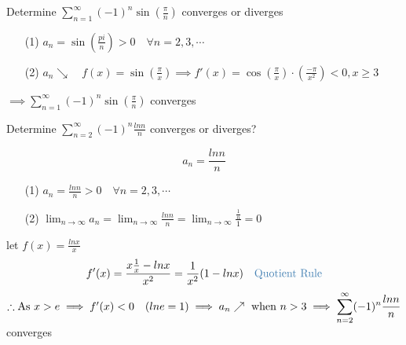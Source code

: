 \begin{eg}
Determine \(\displaystyle \sum^{\infty}_{n = 1} (-1)^n \sin (\frac{\pi}{n})\) converges or diverges

\soln
\begin{itemize}
\item[(1)] \(\displaystyle a_n = \sin (\frac{pi}{n})>0 \quad \forall n = 2, 3, \cdots\)
\item[(2)] \(\displaystyle a_n \searrow \quad f(x) = \sin (\frac{\pi}{x}) \implies f'(x) = \cos (\frac{\pi}{x}) \cdot (\frac{-\pi}{x^2}) < 0, x \geq 3\)
\end{itemize}
\(\implies \displaystyle \sum^{\infty}_{n = 1} (-1)^n \sin (\frac{\pi}{n})\) converges
\end{eg}
\begin{eg}
Determine \(\displaystyle \sum^{\infty}_{n = 2} (-1)^n \frac{ln n}{n}\) converges or diverges?

\soln
\[\displaystyle a_n = \frac{ln n}{n}\]
\begin{itemize}
\item[(1)] \(a_n = \frac{ln n}{n} > 0 \quad \forall n = 2, 3, \cdots\)
\item[(2)] \(\displaystyle \lim_{n \to \infty} a_n = \lim_{n \to \infty} \frac{ln n}{n} = \lim_{n \to \infty} \frac{\frac{1}{n}}{1} = 0\)
\end{itemize}
let \(\displaystyle f(x) = \frac{lnx}{x}\)
\[\displaystyle f'(x) = \frac{x \frac{1}{x} - lnx}{x^2} = \frac{1}{x^2} (1 - lnx) \text{\quad \tssteelblue{Quotient Rule}}\]
\(\therefore \text{As } x > e \implies f'(x) < 0 \quad (ln e =1)\\
\implies a_n \nearrow \text{ when } n > 3\\
\implies \displaystyle \sum^{\infty}_{n = 2} (-1)^n \frac{ln n}{n}\) converges
\end{eg}
